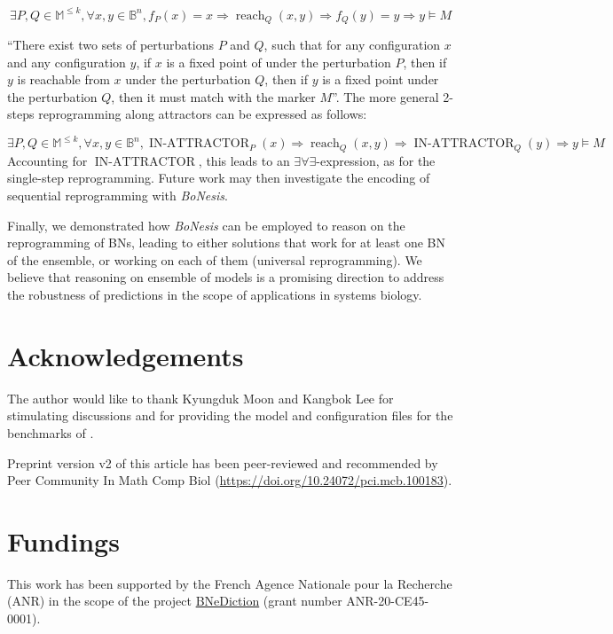 \documentclass[PCJ,Unicode,screen,mode=plain]{cedram}
\begin{document}
\[\exists P,Q\in\mathbb M^{\leq k}, \forall x,y\in\mathbb B^n,
   f_P(x) = x \Rightarrow
      \operatorname{reach}_Q(x,y) \Rightarrow
      f_Q(y) = y \Rightarrow y\models M\]

``There exist two sets of perturbations \(P\) and \(Q\), such that for
any configuration \(x\) and any configuration \(y\), if \(x\) is a fixed
point of under the perturbation \(P\), then if \(y\) is reachable from
\(x\) under the perturbation \(Q\), then if \(y\) is a fixed point under
the perturbation \(Q\), then it must match with the marker \(M\)''. The
more general 2-steps reprogramming along attractors can be expressed as
follows:

\[\exists P,Q\in\mathbb M^{\leq k}, \forall x,y\in\mathbb B^n,
\operatorname{IN-ATTRACTOR}_P(x) \Rightarrow
     \operatorname{reach}_Q(x,y) \Rightarrow
     \operatorname{IN-ATTRACTOR}_Q(y) \Rightarrow y \models M\]
Accounting for \(\operatorname{IN-ATTRACTOR}\), this leads to an
\(\exists\forall\exists\)-expression, as for the single-step
reprogramming. Future work may then investigate the encoding of
sequential reprogramming with \emph{BoNesis}.

Finally, we demonstrated how \emph{BoNesis} can be employed to reason on
the reprogramming of BNs, leading to either solutions that work for at
least one BN of the ensemble, or working on each of them (universal
reprogramming). We believe that reasoning on ensemble of models is a
promising direction to address the robustness of predictions in the
scope of applications in systems biology.

\section*{Acknowledgements}

The author would like to thank Kyungduk Moon and Kangbok Lee for
stimulating discussions and for providing the model and configuration
files for the benchmarks of \citet{Moon22}.

Preprint version v2 of this article has been peer-reviewed and recommended by Peer Community In
Math Comp Biol (\url{https://doi.org/10.24072/pci.mcb.100183}).

\section*{Fundings}

This work has been supported by the French Agence Nationale pour la
Recherche (ANR) in the scope of the project
\href{https://bnediction.github.io}{BNeDiction} (grant number
ANR-20-CE45-0001).
\end{document}
